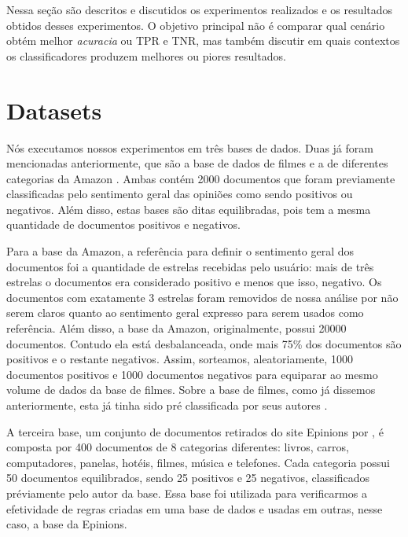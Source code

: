 \documentclass[template.tex]{subfiles}
\begin{document}

Nessa seção são descritos e discutidos os experimentos realizados e os resultados obtidos desses experimentos. O objetivo principal não é comparar qual cenário obtém melhor \textit{acuracia} ou TPR e TNR, mas também discutir em quais contextos os classificadores produzem melhores ou piores resultados.

\section{Datasets}

Nós executamos nossos experimentos em três bases de dados. Duas já foram mencionadas anteriormente, que são a base de dados de filmes \cite{pang2004sentimental} e a de diferentes categorias da Amazon \cite{wang2011latent}. Ambas contém 2000 documentos que foram previamente classificadas pelo sentimento geral das opiniões como sendo positivos ou negativos. Além disso, estas bases são ditas equilibradas, pois tem a mesma quantidade de documentos positivos e negativos. 

Para a base da Amazon, a referência para definir o sentimento geral dos documentos foi a quantidade de estrelas recebidas pelo usuário: mais de três estrelas o documentos era considerado positivo e menos que isso, negativo. Os documentos com exatamente 3 estrelas foram removidos de nossa análise por não serem claros quanto ao sentimento geral expresso para serem usados como referência. Além disso, a base da Amazon, originalmente, possui 20000 documentos. Contudo ela está  desbalanceada, onde mais 75\% dos documentos são positivos e o restante negativos. Assim, sorteamos, aleatoriamente, 1000 documentos positivos e 1000 documentos negativos para equiparar ao mesmo volume de dados da base de filmes. Sobre a base de filmes, como já dissemos anteriormente, esta já tinha sido pré classificada por seus autores \cite{pang2004sentimental}.

A terceira base, um conjunto de documentos retirados do site Epinions por \cite{taboada2011lexicon}, é composta por 400 documentos de 8 categorias diferentes: livros, carros, computadores, panelas, hotéis, filmes, música e telefones. Cada categoria possui 50 documentos equilibrados, sendo 25 positivos e 25 negativos, classificados préviamente pelo autor da base. Essa base foi utilizada para verificarmos a efetividade de regras criadas em uma base de dados e usadas em outras, nesse caso, a base da Epinions. 
\end{document}
